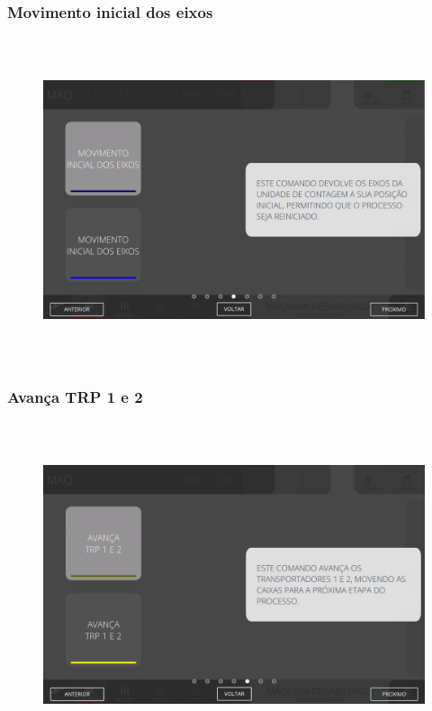 \newpage
\thispagestyle{fancy}
\vspace*{40 pt}
\subsubsection{\small{Movimento inicial dos eixos}}
\vspace*{\fill}
\begin{figure}[h]
  \centering
  \includegraphics[width=576px,height=360px]{src/imagesFlexo/08-count/commands/e-4.png}
\end{figure}
\vspace*{\fill}

\newpage
\thispagestyle{fancy}
\vspace*{40 pt}
\subsubsection{\small{Avança TRP 1 e 2}}
\vspace*{\fill}
\begin{figure}[h]
  \centering
  \includegraphics[width=576px,height=360px]{src/imagesFlexo/08-count/commands/e-5.png}
\end{figure}
\vspace*{\fill}

